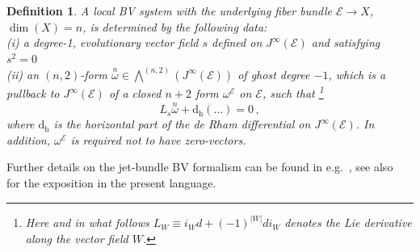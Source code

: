 \documentclass[a4paper,12pt]{article}
\numberwithin{equation}{section} %
\newtheorem{definition}[thm]{Definition}
\newcommand{\p}[1]{|#1|}
\renewcommand{\dh}{\mathrm{d_h}}
\newcommand{\st}[2]{{\overset{#1}{#2}}}
\def\cE{\mathcal{E}}
\begin{document}
\begin{definition}\label{def:local-BV}
    A local BV  system  with the underlying fiber bundle $\cE\to X$,  $\dim(X)=n$,
    is determined by the following data:\\
(i) a degree-1, evolutionary vector field $s$ defined on $J^\infty(\cE)$ and satisfying $s^2=0$\\
(ii) an $(n,2)$-form $\st{n}{\omega}\in \bigwedge^{(n,2)}(J^\infty(\cE))$ of ghost degree $-1$, which is a pullback to $J^\infty(\cE)$ of a closed $n+2$ form $\omega^\cE$ on $\cE$, 
such that
\footnote{Here and in what follows $L_W \equiv i_W d +(-1)^{\p{W}} di_W$ denotes the Lie derivative along the vector field $W$.}
\begin{equation}
\label{eq:s-inv}
L_s\st{n}{\omega}+\dh (\ldots)=0\,, %
\end{equation}
where $\dh$ is the horizontal part of the de Rham differential on $J^\infty(\cE)$. In addition, $\omega^\cE$ is required not to have zero-vectors.  
\end{definition}
Further details on the jet-bundle BV formalism can be found in e.g.~\cite{Barnich:2000zw}, see also~\cite{Grigoriev:2022zlq} for the exposition in the present language.
\end{document}

